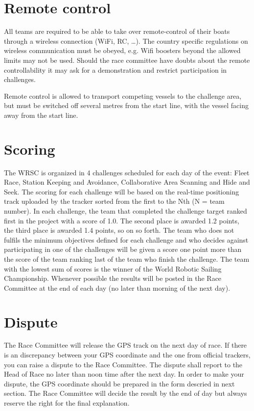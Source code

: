 \documentclass[12pt]{article}
\begin{document}
\section{Remote control}
All teams are required to be able to take over remote-control of their boats
through a wireless connection (WiFi, RC, \ldots). The country specific 
regulations on wireless communication must be obeyed, e.g. Wifi boosters beyond
the allowed limits may not be used.
Should the race committee have doubts about the remote controllability it may
ask for a demonstration and restrict participation in challenges.

Remote control is allowed to transport competing vessels to the challenge area,
but must be switched off several metres from the start line, with the vessel
facing away from the start line.


\section{Scoring}
The WRSC is organized in 4 challenges scheduled for each day of the event: Fleet Race, Station Keeping and Avoidance, Collaborative Area Scanning and Hide and Seek. 
The scoring for each challenge will be based on the real-time positioning track uploaded by the tracker sorted from the first to the Nth (N = team number). 
In each challenge, the team that completed the challenge target ranked first in the project with a score of 1.0. The second place is awarded 1.2 points, the third place is awarded 1.4 points, so on so forth. 
The team who does not fulfils the minimum objectives defined for each challenge and who decides against participating in one of the challenges will be given a score one point more than the score of the team ranking last of the team who finish the challenge. The team with the lowest sum of scores is the winner of the World Robotic Sailing Championship. Whenever possible the results will be posted in the Race Committee at the end of each day (no later than morning of the next day). 


\section{Dispute}
The Race Committee will release the GPS track on the next day of race.
If there is an discrepancy between your GPS coordinate and the one from official trackers, you can raise a dispute to the Race Committee.
The dispute shall report to the Head of Race no later than noon time after the next day.
In order to make your dispute, the GPS coordinate should be prepared in the form descried in next section.
The Race Committee will decide the result by the end of day but always reserve the right for the final explanation.  
\end{document}
